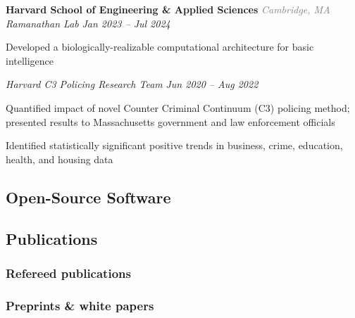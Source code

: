 \documentclass[12pt,letterpaper]{article}
\begin{document}
\vspace{7pt}

\textbf{Harvard School of Engineering \& Applied Sciences} {\small\textit{\textcolor{gray}{Cambridge, MA}}}\\
\textit{Ramanathan Lab} {\small \textit{\hfill \textcolor{niceblue}{Jan 2023 -- Jul 2024}}}
\begin{bulletdescription}
      \item
            Developed a biologically-realizable computational architecture for basic intelligence
\end{bulletdescription}
\textit{Harvard C3 Policing Research Team} {\small \textit{\hfill \textcolor{niceblue}{Jun 2020 -- Aug 2022}}}
\begin{bulletdescription}
      \item
            Quantified impact of novel Counter Criminal Continuum (C3) policing method; presented results to Massachusetts government and law enforcement officials
      \item
            Identified statistically significant positive trends in business, crime, education, health, and housing data
\end{bulletdescription}

\subsection{Open-Source Software}
\begin{list}{}{\cvlist}
  
\end{list}

\ifdefined\withpubs
  \subsection{Publications}
  

  \subsubsection{Refereed publications}
  \begin{list}{}{\cvlist}
    
  \end{list}

  \subsubsection{Preprints \& white papers}
  \begin{list}{}{\cvlist}
    
  \end{list}
\fi
\end{document}
